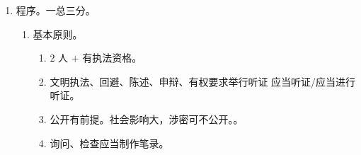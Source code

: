 \begin{enumerate}
\begin{enumerate}
\begin{enumerate}
\begin{enumerate}
                                \begin{itemize}
                                  \item 违法行为终了之日起算。行为的连续，不是结果的连续。。
                                  \item 只适用行政处罚！！。
                                \end{itemize}
                        \end{enumerate}
                  \item 不重罚。责令改正（强制措施），以罚代改。
                  \item {}。，。。
                  \item 从轻 \hz 减轻。主动消除 \hz 减轻违法行为危害后果。
                  \item 从重。后果严重、教唆胁迫诱骗、打击报复、6 个月内曾受过治安管理处罚。。
                  \item {}。
                        \begin{enumerate}
                          \item 技术 + 法制部门双重审核 \yjt 行政机关二次审核。
                          \item 符合标准、设置合理、标志明显。
                          \item {}。
                        \end{enumerate}
                \end{enumerate}
          \item 程序。一总三分。
                \begin{enumerate}
                  \item 基本原则。
                        \begin{enumerate}
                          \item 2 人 + 有执法资格。
                          \item 文明执法、回避、陈述、申辩、有权要求举行听证 \bdy 应当听证/应当进行听证。
                          \item 公开有前提。社会影响大，涉密可不公开。。
                          \item 询问、检查应当制作笔录。

\end{enumerate}
\end{enumerate}
\end{enumerate}
\end{enumerate}
